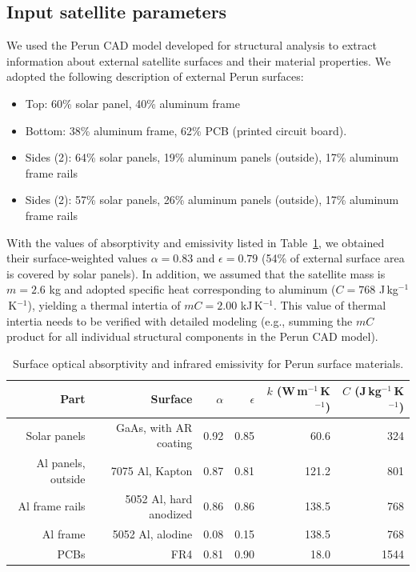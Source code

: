 \documentclass[]{aastex62}
\begin{document}
\subsection{Input satellite parameters}

We used the Perun CAD model developed for structural analysis to extract information about
external satellite surfaces and their material properties. We adopted the following description 
of external Perun surfaces: 
\begin{itemize}
\item  Top: 60\% solar panel, 40\% aluminum frame
\item  Bottom: 38\% aluminum frame, 62\% PCB (printed circuit board). 
\item  Sides (2): 64\% solar panels, 19\% aluminum panels (outside), 17\% aluminum frame rails
\item  Sides (2): 57\% solar panels, 26\% aluminum panels (outside), 17\% aluminum frame rails
\end{itemize}

With the values of absorptivity and emissivity listed in Table~\ref{tab:inputsAbsEmiss}, we obtained
their surface-weighted values $\alpha=0.83$ and $\epsilon=0.79$ (54\% of external surface area
is covered by solar panels). In addition, we assumed that the satellite mass is $m=2.6$ kg and 
adopted specific heat corresponding to aluminum ($C=768$  J\,kg$^{-1}$\,K$^{-1}$), yielding a
thermal intertia of $mC = 2.00$ kJ\,K$^{-1}$. This value of thermal intertia needs to be verified with 
detailed modeling (e.g., summing the $mC$ product for all individual structural components
in the Perun CAD model). 

\begin{table}[t]
	\centering
	\caption{Surface optical absorptivity and infrared emissivity for Perun surface materials. }
	\label{tab:inputsAbsEmiss}
	\begin{tabular}{r|r|r|r|r|r} %
		\hline
  	              Part        &                Surface          &    $\alpha$  &   $\epsilon$    &   $k$ (W\,m$^{-1}$\,K$^{-1}$)   &  $C$ (J\,kg$^{-1}$\,K$^{-1}$)  \\
	  	\hline
         Solar panels        &       GaAs, with AR coating  &           0.92      &          0.85      &   60.6    &      324   \\  
     Al panels, outside   &     7075 Al, Kapton             &           0.87       &         0.81       &  121.2   &    801   \\ 
          Al frame rails    &       5052 Al, hard anodized &          0.86        &        0.86      &    138.5   &    768    \\  
                Al frame      &       5052 Al, alodine            &          0.08        &        0.15       &   138.5   &    768    \\
                PCBs            &               FR4                        &           0.81       &         0.90        &   18.0  &    1544  \\ 
 		\hline     
	\end{tabular} 
\end{table}
 
\end{document}
